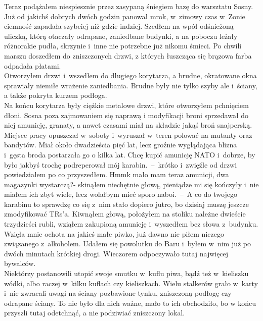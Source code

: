 \documentclass[../MAIN.tex]{subfiles}
\begin{document}
Teraz podążałem niespiesznie przez zasypaną śniegiem bazę do
warsztatu Sosny. Już od jakichś dobrych dwóch godzin panował
mrok, w~zimowy czas w~Zonie ciemność zapadała szybciej niż
gdzie indziej. Szedłem na wpół odśnieżoną uliczką, którą
otaczały odrapane, zaniedbane budynki, a na poboczu leżały
różnorakie pudła, skrzynie i~inne nie potrzebne już nikomu
śmieci. Po chwili marszu doszedłem do zniszczonych drzwi, z
których łuszcząca się brązowa farba odpadała płatami.
\\
Otworzyłem drzwi i~wszedłem do długiego korytarza, a brudne,
okratowane okna sprawiały niemiłe wrażenie zaniedbania. Brudne
były nie tylko szyby ale i~ściany, a także pokryta kurzem
podłoga.
\\
Na końcu korytarza były ciężkie metalowe drzwi, które
otworzyłem pchnięciem dłoni. Sosna poza zajmowaniem się naprawą
i modyfikacji broni sprzedawał do niej amunicję, granaty, a
nawet czasami miał na składzie jakąś broń snajperską. Miejsce
pracy opuszczał w~soboty i~wyruszał w~teren polować na mutanty
oraz bandytów. Miał około dwadzieścia pięć lat, lecz groźnie
wyglądająca blizna i~gęsta broda postarzała go o kilka lat.
\sd
\xx Chcę kupić amunicję NATO i~dobrze, by było jakbyś trochę
podreperował mój karabin.~--~krótko i~zwięźle od drzwi
powiedziałem po co przyszedłem.
\xx Hmm\3k mało mam teraz amunicji, dwa magazynki wystarczą?-
skinąłem niechętnie głową, pieniądze mi się kończyły i~nie
miałem ich zbyt wiele, lecz wolałbym mieć sporo naboi.~--~A co
do
twojego karabinu to sprawdzę co się z~nim stało dopiero jutro,
bo dzisiaj muszę jeszcze zmodyfikować TRs’a.
\qd
Kiwnąłem głową, położyłem na stoliku należne dwieście
trzydzieści rubli, wziąłem zakupioną amunicję i~wyszedłem bez
słowa z~budynku. Wzięła mnie ochota na jakieś małe piwko, już
dawno nie piłem niczego związanego z~alkoholem. Udałem się
powolutku do Baru i~byłem w~nim już po dwóch minutach krótkiej
drogi. Wieczorem odpoczywało tutaj najwięcej bywalców.
\\
Niektórzy postanowili utopić swoje smutku w~kuflu piwa, bądź
też w~kieliszku wódki, albo raczej w~kilku kuflach czy
kieliszkach. Wielu stalkerów grało w~karty i~nie zwracali uwagi
na ściany pozbawione tynku, zniszczoną podłogę czy odrapane
ściany. To nie było dla nich ważne, mało to ich obchodziło, bo
w końcu przyszli tutaj odetchnąć, a nie podziwiać zniszczony
lokal.
\end{document}
